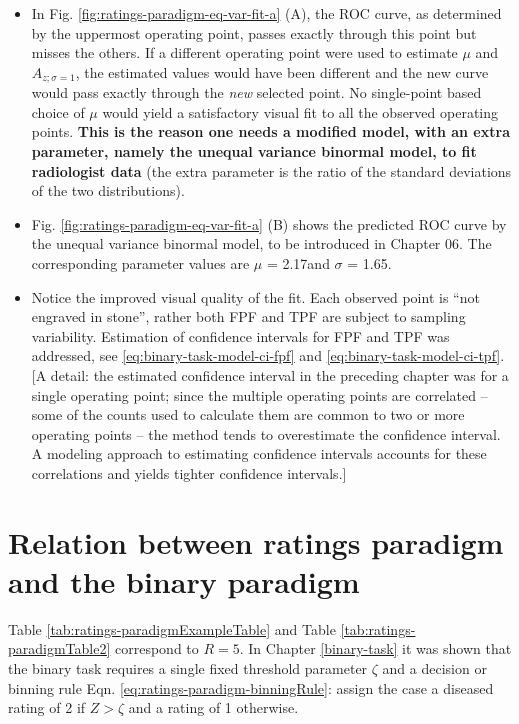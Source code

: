 \documentclass[
]{book}
\begin{document}
\begin{itemize}
\item
  In Fig. \ref{fig:ratings-paradigm-eq-var-fit-a} (A), the ROC curve, as determined by the uppermost operating point, passes exactly through this point but misses the others. If a different operating point were used to estimate \(\mu\) and \(A_{z;\sigma = 1}\), the estimated values would have been different and the new curve would pass exactly through the \emph{new} selected point. No single-point based choice of \(\mu\) would yield a satisfactory visual fit to all the observed operating points. \textbf{This is the reason one needs a modified model, with an extra parameter, namely the unequal variance binormal model, to fit radiologist data} (the extra parameter is the ratio of the standard deviations of the two distributions).
\item
  Fig. \ref{fig:ratings-paradigm-eq-var-fit-a} (B) shows the predicted ROC curve by the unequal variance binormal model, to be introduced in Chapter 06. The corresponding parameter values are \(\mu\) = 2.17and \(\sigma\) = 1.65.
\item
  Notice the improved visual quality of the fit. Each observed point is ``not engraved in stone'', rather both FPF and TPF are subject to sampling variability. Estimation of confidence intervals for FPF and TPF was addressed, see \eqref{eq:binary-task-model-ci-fpf} and \eqref{eq:binary-task-model-ci-tpf}. {[}A detail: the estimated confidence interval in the preceding chapter was for a single operating point; since the multiple operating points are correlated -- some of the counts used to calculate them are common to two or more operating points -- the method tends to overestimate the confidence interval. A modeling approach to estimating confidence intervals accounts for these correlations and yields tighter confidence intervals.{]}
\end{itemize}

\hypertarget{binary-task-relation-to-rating}{%
\section{Relation between ratings paradigm and the binary paradigm}\label{binary-task-relation-to-rating}}

Table \ref{tab:ratings-paradigmExampleTable} and Table \ref{tab:ratings-paradigmTable2} correspond to \(R = 5\). In Chapter \ref{binary-task} it was shown that the binary task requires a single fixed threshold parameter \(\zeta\) and a decision or binning rule Eqn. \eqref{eq:ratings-paradigm-binningRule}: assign the case a diseased rating of 2 if \(Z > \zeta\) and a rating of 1 otherwise.
\end{document}
